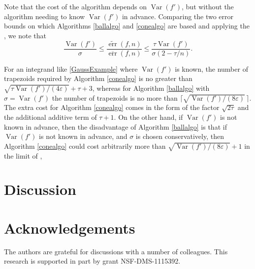 \documentclass[]{article}
\DeclareMathOperator{\Var}{Var}
\DeclareMathOperator{\err}{err}
\newcommand{\oerr}{\overline{\err}}
\newcommand{\terr}{\widetilde{\err}}
\theoremstyle{definition}
\theoremstyle{remark}
\begin{document}
Note that the cost of the algorithm depends on $\Var(f')$, but without the algorithm needing to know $\Var(f')$ in advance.   Comparing the two error bounds on which Algorithms \ref{ballalgo} and \ref{conealgo} are based and applying the , we note that 
\begin{equation*}
\frac{\Var(f')}{\sigma} \le
\frac{\terr(f,n)}{\oerr(f,n)}
\le \frac{\tau\Var(f')}{\sigma (2-\tau/n)}.
\end{equation*}



For an integrand like \eqref{GaussExample} where $\Var(f')$ is known, the number of trapezoids required by Algorithm \ref{conealgo} is no greater than  $\sqrt{\tau \Var(f') /(4\varepsilon)} + \tau + 3$, whereas for Algorithm \ref{ballalgo} with $\sigma=\Var(f')$ the number of trapezoids is no more than $\bigl \lceil \sqrt{\Var(f') /(8\varepsilon)} \, \bigr\rceil$.  The extra cost for Algorithm \ref{conealgo} comes in the form of the factor $\sqrt{2\tau}$ and the additional additive term of $\tau+1$.  On the other hand, if $\Var(f')$ is not known in advance, then the disadvantage of Algorithm  \ref{ballalgo} is that if $\Var(f')$ is not known in advance, and $\sigma$ is chosen conservatively, then Algorithm \ref{conealgo} could cost arbitrarily more than $\sqrt{\Var(f') /(8\varepsilon)}+1$ in the limit of , 

\section{Discussion} \label{discusssec}

\section{Acknowledgements}  The authors are grateful for discussions with a number of colleagues. This research is supported in part by grant NSF-DMS-1115392.


\end{document}
